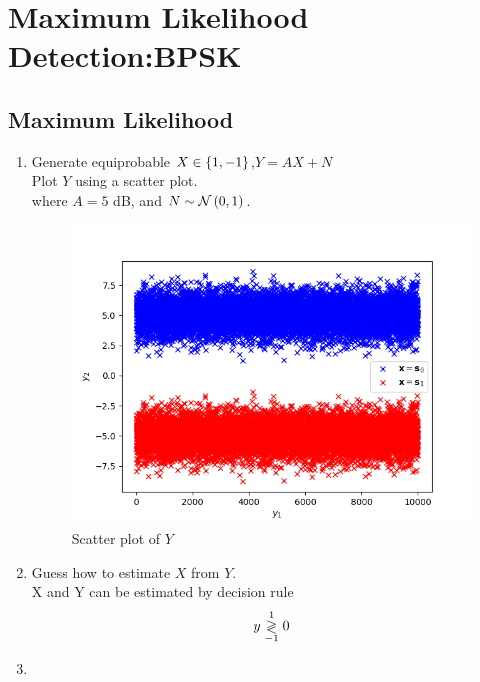 \documentclass[10pt, a4paper]{article}
\begin{document}
\section{Maximum Likelihood Detection:BPSK}
\subsection{Maximum Likelihood}
\begin{enumerate}
\item Generate equiprobable $X \in \left\{1,-1\right\}$,$Y = AX+N$ \\ Plot $Y$ using a scatter plot.\\
		where $A = 5$ dB,  and $N \sim \mathcal{N}\left(0,1\right)$.\\
  \solution  
\begin{center}
\end{center}
\begin{figure}[!h]
\centering
\includegraphics[width=\columnwidth]{images/scatter.png}
\caption{Scatter plot of $Y$}
\label{fig:bpsk_scatter}
\end{figure}
\item Guess how to estimate $X$ from $Y$.\\
\solution
X and Y can be estimated by decision rule\\
\begin{equation}
y \overset{1}{\underset{-1}{\gtrless}} 0
\label{eq:bpsk_decision}
\end{equation}
\item

\end{enumerate}
\end{document}
